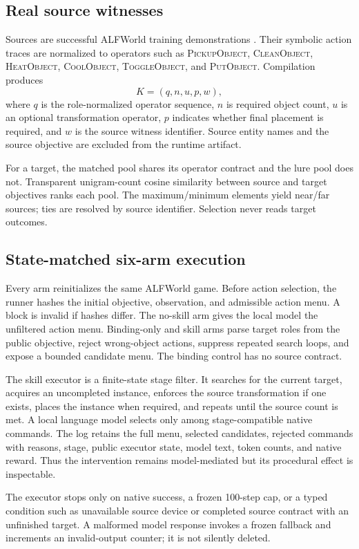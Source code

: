 \documentclass[pdflatex,sn-mathphys-num]{sn-jnl}
\begin{document}
\subsection{Real source witnesses}
Sources are successful ALFWorld training demonstrations
\citep{shridhar2021alfworld}. Their symbolic action traces are normalized to
operators such as \textsc{PickupObject}, \textsc{CleanObject},
\textsc{HeatObject}, \textsc{CoolObject}, \textsc{ToggleObject}, and
\textsc{PutObject}. Compilation produces
\[
K=(q,n,u,p,w),
\]
where $q$ is the role-normalized operator sequence, $n$ is required object
count, $u$ is an optional transformation operator, $p$ indicates whether final
placement is required, and $w$ is the source witness identifier. Source entity
names and the source objective are excluded from the runtime artifact.

For a target, the matched pool shares its operator contract and the lure pool
does not. Transparent unigram-count cosine similarity between source and target
objectives ranks each pool. The maximum/minimum elements yield near/far sources;
ties are resolved by source identifier. Selection never reads target outcomes.

\subsection{State-matched six-arm execution}
Every arm reinitializes the same ALFWorld game. Before action selection, the
runner hashes the initial objective, observation, and admissible action menu.
A block is invalid if hashes differ. The no-skill arm gives the local model the
unfiltered action menu. Binding-only and skill arms parse target roles from the
public objective, reject wrong-object actions, suppress repeated search loops,
and expose a bounded candidate menu. The binding control has no source contract.

The skill executor is a finite-state stage filter. It searches for the current
target, acquires an uncompleted instance, enforces the source transformation if
one exists, places the instance when required, and repeats until the source
count is met. A local language model selects only among stage-compatible native
commands. The log retains the full menu, selected candidates, rejected commands
with reasons, stage, public executor state, model text, token counts, and native
reward. Thus the intervention remains model-mediated but its procedural effect
is inspectable.

The executor stops only on native success, a frozen 100-step cap, or a typed
condition such as unavailable source device or completed source contract with
an unfinished target. A malformed model response invokes a frozen fallback and
increments an invalid-output counter; it is not silently deleted.
\end{document}
